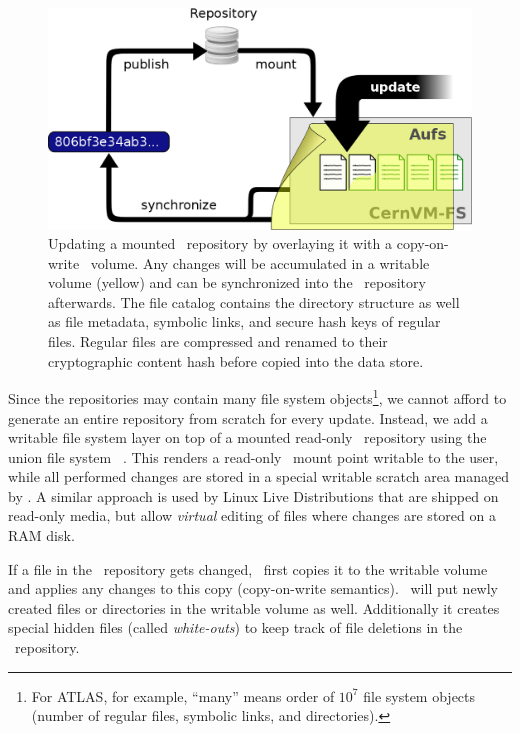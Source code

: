 \begin{figure}[h]
	\includegraphics[width=\textwidth]{figures/update_process.png}
	\caption{Updating a mounted \cvmfs\ repository by overlaying it with a copy-on-write \aufs\ volume.
		Any changes will be accumulated in a writable volume (yellow) and can be synchronized into the \cvmfs\ repository afterwards.
		The file catalog contains the directory structure as well as file metadata, symbolic links, and secure hash keys of regular files.
		Regular files are compressed and renamed to their cryptographic content hash before copied into the data store.}
	\label{fig:installwebserver}
\end{figure}

Since the repositories may contain many file system objects\footnote{For ATLAS, for example, ``many'' means order of $10^7$ file system objects (\ie number of regular files, symbolic links, and directories).}, we cannot afford to generate an entire repository from scratch for every update.
Instead, we add a writable file system layer on top of a mounted read-only \cvmfs\ repository using the union file system \aufs~\cite{aufs}.
This renders a read-only \cvmfs\ mount point writable to the user, while all performed changes are stored in a special writable scratch area managed by \aufs.
A similar approach is used by Linux Live Distributions that are shipped on read-only media, but allow \emph{virtual} editing of files where changes are stored on a RAM disk.

If a file in the \cvmfs\ repository gets changed, \aufs\ first copies it to the writable volume and applies any changes to this copy (copy-on-write semantics).
\aufs\ will put newly created files or directories in the writable volume as well.
Additionally it creates special hidden files (called \emph{white-outs}) to keep track of file deletions in the \cvmfs\ repository.

